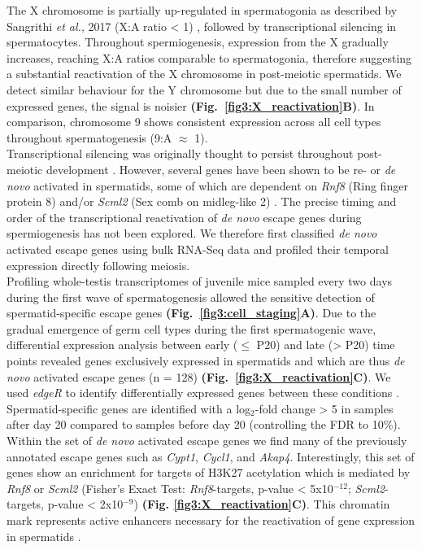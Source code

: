 The X chromosome is partially up-regulated in spermatogonia as described by Sangrithi \emph{et al.}, 2017 (X:A ratio < 1) \citep{Sangrithi2017}, followed by transcriptional silencing in spermatocytes. Throughout spermiogenesis, expression from the X gradually increases, reaching X:A ratios comparable to spermatogonia, therefore suggesting a substantial reactivation of the X chromosome in post-meiotic spermatids. We detect similar behaviour for the Y chromosome but due to the small number of expressed genes, the signal is noisier \textbf{(Fig.~\ref{fig3:X_reactivation}B)}. In comparison, chromosome 9 shows consistent expression across all cell types throughout spermatogenesis (9:A $\approx$ 1).\\

Transcriptional silencing was originally thought to persist throughout post-meiotic development \citep{Greaves2006, Turner2006}. However, several genes have been shown to be re- or \emph{de novo} activated in spermatids, some of which are dependent on \textit{Rnf8} (Ring finger protein 8) and/or \textit{Scml2} (Sex comb on midleg-like 2) \citep{Hasegawa2015, Sin2012, Sin2015}. The precise timing and order of the transcriptional reactivation of \emph{de novo} escape genes during spermiogenesis has not been explored. We therefore first classified \emph{de novo} activated escape genes using bulk RNA-Seq data and profiled their temporal expression directly following meiosis.\\

Profiling whole-testis transcriptomes of juvenile mice sampled every two days during the first wave of spermatogenesis allowed the sensitive detection of spermatid-specific escape genes \textbf{(Fig.~\ref{fig3:cell_staging}A)}. Due to the gradual emergence of germ cell types during the first spermatogenic wave, differential expression analysis between early ($\leq$ P20) and late (> P20) time points revealed genes exclusively expressed in spermatids and which are thus \emph{de novo} activated escape genes (n = 128) \textbf{(Fig.~\ref{fig3:X_reactivation}C)}. We used \emph{edgeR} to identify differentially expressed genes between these conditions \citep{Robinson2009}. Spermatid-specific genes are identified with a log$_2$-fold change > 5 in samples after day 20 compared to samples before day 20 (controlling the FDR to 10\%). \\

Within the set of \emph{de novo} activated escape genes we find many of the previously annotated escape genes such as \textit{Cypt1}, \textit{Cycl1}, and \textit{Akap4}. Interestingly, this set of genes show an enrichment for targets of H3K27 acetylation which is mediated by \textit{Rnf8} or \textit{Scml2} (Fisher's Exact Test: \textit{Rnf8}-targets, p-value < 5x10$^{-12}$; \textit{Scml2}-targets, p-value < 2x10$^{-9}$) \textbf{(Fig. \ref{fig3:X_reactivation}C)}. This chromatin mark represents active enhancers necessary for the reactivation of gene expression in spermatids \citep{Adams2018}. \\


